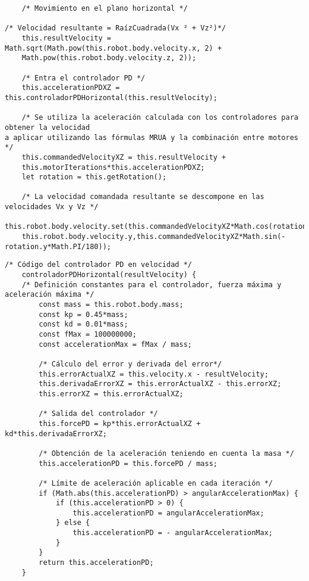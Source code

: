 \footnotesize {
\begin{verbatim}
    /* Movimiento en el plano horizontal */
    
/* Velocidad resultante = RaízCuadrada(Vx ² + Vz²)*/
	this.resultVelocity = Math.sqrt(Math.pow(this.robot.body.velocity.x, 2) + 
	Math.pow(this.robot.body.velocity.z, 2));
	
	/* Entra el controlador PD */
	this.accelerationPDXZ = this.controladorPDHorizontal(this.resultVelocity); 
	
	/* Se utiliza la aceleración calculada con los controladores para obtener la velocidad 
a aplicar utilizando las fórmulas MRUA y la combinación entre motores */
	this.commandedVelocityXZ = this.resultVelocity + 
	this.motorIterations*this.accelerationPDXZ;
	let rotation = this.getRotation();
	
	/* La velocidad comandada resultante se descompone en las velocidades Vx y Vz */
	this.robot.body.velocity.set(this.commandedVelocityXZ*Math.cos(rotation.y*Math.PI/180), 
	this.robot.body.velocity.y,this.commandedVelocityXZ*Math.sin(-rotation.y*Math.PI/180));
\end{verbatim}
}

\footnotesize {
\begin{verbatim}
/* Código del controlador PD en velocidad */
    controladorPDHorizontal(resultVelocity) {
    /* Definición constantes para el controlador, fuerza máxima y aceleración máxima */
        const mass = this.robot.body.mass;
        const kp = 0.45*mass;
        const kd = 0.01*mass;
        const fMax = 100000000;
        const accelerationMax = fMax / mass;

        /* Cálculo del error y derivada del error*/
        this.errorActualXZ = this.velocity.x - resultVelocity;
        this.derivadaErrorXZ = this.errorActualXZ - this.errorXZ;
        this.errorXZ = this.errorActualXZ;

        /* Salida del controlador */
        this.forcePD = kp*this.errorActualXZ + kd*this.derivadaErrorXZ;
        
        /* Obtención de la aceleración teniendo en cuenta la masa */
        this.accelerationPD = this.forcePD / mass;

        /* Límite de aceleración aplicable en cada iteración */
        if (Math.abs(this.accelerationPD) > angularAccelerationMax) {
            if (this.accelerationPD > 0) {
                this.accelerationPD = angularAccelerationMax;
            } else {
                this.accelerationPD = - angularAccelerationMax;
            }
        }
        return this.accelerationPD;
    }
\end{verbatim}
}

